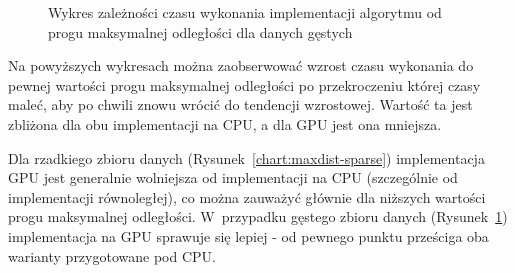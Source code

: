 \documentclass[12pt]{article}
\begin{document}
\begin{figure}[H]
\caption{Wykres zależności czasu wykonania implementacji algorytmu od progu maksymalnej odległości dla danych gęstych}
\label{chart:maxdist-nonsparse}
\end{figure}

Na powyższych wykresach można zaobserwować wzrost czasu wykonania do pewnej wartości progu maksymalnej odległości po przekroczeniu której czasy maleć, aby po chwili znowu wrócić do tendencji wzrostowej. Wartość ta jest zbliżona dla obu implementacji na CPU, a dla GPU jest ona mniejsza.

Dla rzadkiego zbioru danych (Rysunek~\ref{chart:maxdist-sparse}) implementacja GPU jest generalnie wolniejsza od implementacji na CPU (szczególnie od implementacji równoległej), co można zauważyć głównie dla niższych wartości progu maksymalnej odległości. W~przypadku gęstego zbioru danych (Rysunek~\ref{chart:maxdist-nonsparse}) implementacja na GPU sprawuje się lepiej - od pewnego punktu prześciga oba warianty przygotowane pod CPU.
\end{document}
